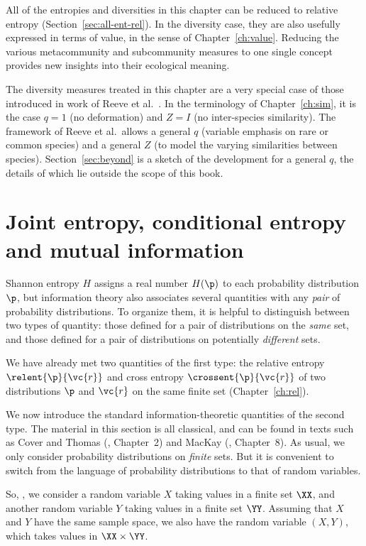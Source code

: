 All of the entropies and diversities in this chapter can be reduced to
relative entropy (Section~\ref{sec:all-ent-rel}).  In the diversity case,
they are also usefully expressed in terms of value, in the sense of
Chapter~\ref{ch:value}.  Reducing the various metacommunity and
subcommunity measures to one single concept provides new insights into
their ecological meaning.

The diversity measures treated in this chapter are a very special case of
those introduced in work of Reeve%
%
% 
et al.~\cite{HPD}.  In the terminology of Chapter~\ref{ch:sim}, it is the
case $q = 1$ (no deformation) and $Z = I$ (no inter-species similarity).
The framework of Reeve et al.\ allows a general $q$ (variable emphasis on
rare or common species) and a general $Z$ (to model the varying
similarities between species).  Section~\ref{sec:beyond} is a sketch of the
development for a general $q$, the details of which lie outside the scope
of this book.


\section{Joint entropy, conditional entropy and mutual information}


Shannon entropy $H$ assigns a real number $H(\p)$ to each probability
distribution $\p$, but information theory also associates several
quantities with any \emph{pair} of probability distributions.  To organize
them, it is helpful to distinguish between two types of quantity:
those defined for a pair of distributions on the \emph{same} set, and those
defined for a pair of distributions on potentially \emph{different} sets.

We have already met two quantities of the first type: the relative entropy
$\relent{\p}{\vc{r}}$ and cross entropy $\crossent{\p}{\vc{r}}$ of two
distributions $\p$ and $\vc{r}$ on the same finite set
(Chapter~\ref{ch:rel}).  

We now introduce the standard information-theoretic quantities of the
second type.  The material in this section is all classical, and can be
found in texts such as Cover and Thomas (\cite{CoTh1}, Chapter~2) and
MacKay (\cite{MacKITI}, Chapter~8).  As usual, we only
consider probability distributions on \emph{finite} sets.  But it is
convenient to switch from the language of probability distributions to that
of random variables.%
%

So, , we consider a random variable $X$
taking values in a finite set $\XX$, and another random variable $Y$ taking
values in a finite set $\YY$.  Assuming that $X$ and $Y$ have the same
sample space, we also have the random variable $(X, Y)$, which takes values
in $\XX \times \YY$.

